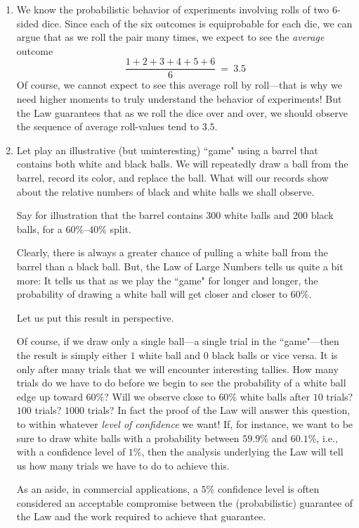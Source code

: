 \begin{enumerate}
\item
We know the probabilistic behavior of experiments involving rolls of two $6$-sided dice.  Since each of the six outcomes is equiprobable for each die, we can argue that as we roll the pair many times, we expect to see the {\em average} outcome
\[ \frac{1+2+3+4+5+6}{6} \ = \ 3.5 \]
Of course, we cannot expect to see this average roll by roll---that is why we need higher moments to truly understand the behavior of experiments!  But the Law guarantees that as we roll the dice over and over, we should observe the sequence of average roll-values tend to $3.5$.

\item
Let play an illustrative (but uninteresting) ``game" using a barrel that contains both white and black balls.  We will repeatedly draw a ball from the barrel, record its color, and replace the ball.  What will our records show about the relative numbers of black and white balls we shall observe.

\smallskip

Say for illustration that the barrel contains 300 white balls and 200 black balls, for a $60\%$--$40\%$ split.

Clearly, there is always a greater chance of pulling a white ball from the barrel than a black ball.  But, the Law of Large Numbers tells us quite a bit more:  It tells us that as we play the ``game" for longer and longer, the probability of drawing a white ball will get closer and closer to $60\%$.

\smallskip

Let us put this result in perspective.

\smallskip

Of course, if we draw only a single ball---a single trial in the ``game"---then the result is simply either $1$ white ball and $0$ black balls or vice versa.  It is only after many trials that we will encounter interesting tallies. How many trials do we have to do before we begin to see the probability of a white ball edge up toward $60\%$?  Will we observe close to $60\%$ white balls after $10$ trials? $100$ trials? $1000$ trials?  In fact the proof of the Law will answer this question, to within whatever {\it level of confidence} we want!  If, for instance, we want to be sure to draw white balls with a probability between $59.9\%$ and $60.1\%$, i.e., with a confidence level of $1\%$, then the analysis underlying the Law will tell us how many trials we have to do to achieve this.

As an aside, in commercial applications, a $5\%$ confidence level is often considered an acceptable compromise between the (probabilistic) guarantee of the Law and the work required to achieve that guarantee.
\end{enumerate}

